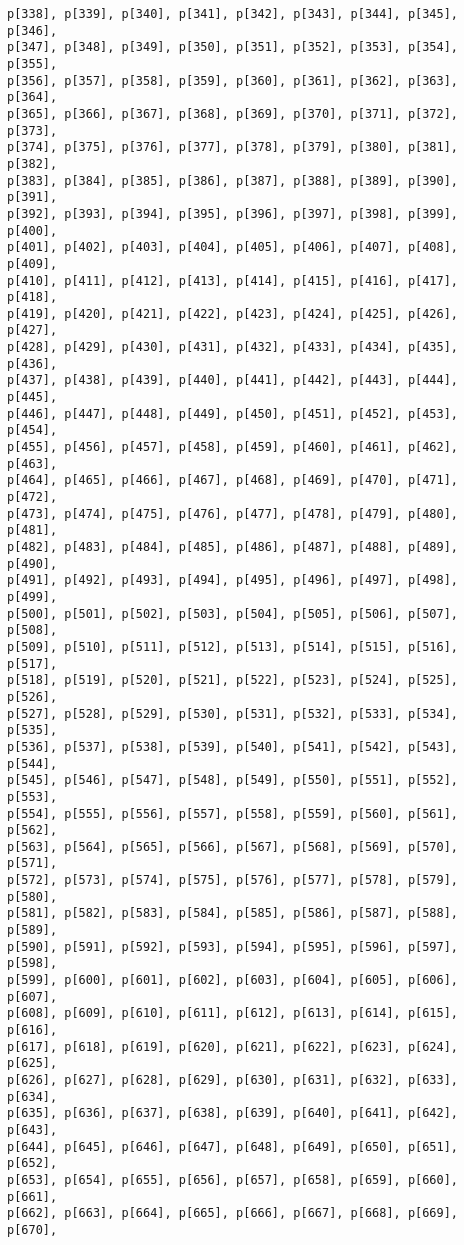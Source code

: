 \documentclass[
  letterpaper,
  DIV=11,
  numbers=noendperiod]{scrartcl}
\begin{document}
\begin{verbatim}
p[338], p[339], p[340], p[341], p[342], p[343], p[344], p[345], p[346],
p[347], p[348], p[349], p[350], p[351], p[352], p[353], p[354], p[355],
p[356], p[357], p[358], p[359], p[360], p[361], p[362], p[363], p[364],
p[365], p[366], p[367], p[368], p[369], p[370], p[371], p[372], p[373],
p[374], p[375], p[376], p[377], p[378], p[379], p[380], p[381], p[382],
p[383], p[384], p[385], p[386], p[387], p[388], p[389], p[390], p[391],
p[392], p[393], p[394], p[395], p[396], p[397], p[398], p[399], p[400],
p[401], p[402], p[403], p[404], p[405], p[406], p[407], p[408], p[409],
p[410], p[411], p[412], p[413], p[414], p[415], p[416], p[417], p[418],
p[419], p[420], p[421], p[422], p[423], p[424], p[425], p[426], p[427],
p[428], p[429], p[430], p[431], p[432], p[433], p[434], p[435], p[436],
p[437], p[438], p[439], p[440], p[441], p[442], p[443], p[444], p[445],
p[446], p[447], p[448], p[449], p[450], p[451], p[452], p[453], p[454],
p[455], p[456], p[457], p[458], p[459], p[460], p[461], p[462], p[463],
p[464], p[465], p[466], p[467], p[468], p[469], p[470], p[471], p[472],
p[473], p[474], p[475], p[476], p[477], p[478], p[479], p[480], p[481],
p[482], p[483], p[484], p[485], p[486], p[487], p[488], p[489], p[490],
p[491], p[492], p[493], p[494], p[495], p[496], p[497], p[498], p[499],
p[500], p[501], p[502], p[503], p[504], p[505], p[506], p[507], p[508],
p[509], p[510], p[511], p[512], p[513], p[514], p[515], p[516], p[517],
p[518], p[519], p[520], p[521], p[522], p[523], p[524], p[525], p[526],
p[527], p[528], p[529], p[530], p[531], p[532], p[533], p[534], p[535],
p[536], p[537], p[538], p[539], p[540], p[541], p[542], p[543], p[544],
p[545], p[546], p[547], p[548], p[549], p[550], p[551], p[552], p[553],
p[554], p[555], p[556], p[557], p[558], p[559], p[560], p[561], p[562],
p[563], p[564], p[565], p[566], p[567], p[568], p[569], p[570], p[571],
p[572], p[573], p[574], p[575], p[576], p[577], p[578], p[579], p[580],
p[581], p[582], p[583], p[584], p[585], p[586], p[587], p[588], p[589],
p[590], p[591], p[592], p[593], p[594], p[595], p[596], p[597], p[598],
p[599], p[600], p[601], p[602], p[603], p[604], p[605], p[606], p[607],
p[608], p[609], p[610], p[611], p[612], p[613], p[614], p[615], p[616],
p[617], p[618], p[619], p[620], p[621], p[622], p[623], p[624], p[625],
p[626], p[627], p[628], p[629], p[630], p[631], p[632], p[633], p[634],
p[635], p[636], p[637], p[638], p[639], p[640], p[641], p[642], p[643],
p[644], p[645], p[646], p[647], p[648], p[649], p[650], p[651], p[652],
p[653], p[654], p[655], p[656], p[657], p[658], p[659], p[660], p[661],
p[662], p[663], p[664], p[665], p[666], p[667], p[668], p[669], p[670],

\end{verbatim}
\end{document}
